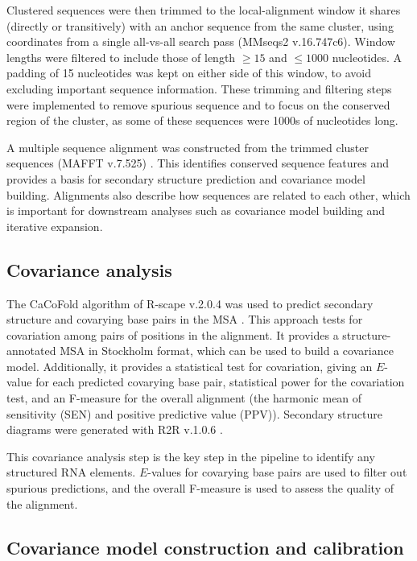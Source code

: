 Clustered sequences were then trimmed to the local-alignment window it shares (directly or transitively) with an anchor sequence from the same cluster, using coordinates from a single all-vs-all search pass (MMseqs2 v.16.747c6).
Window lengths were filtered to include those of length $\geq 15$ and $\leq 1000$ nucleotides.
A padding of 15 nucleotides was kept on either side of this window, to avoid excluding important sequence information.
These trimming and filtering steps were implemented to remove spurious sequence and to focus on the conserved region of the cluster, as some of these sequences were 1000s of nucleotides long.

\label{subsec:rna-alignment}

A multiple sequence alignment was constructed from the trimmed cluster sequences (MAFFT v.7.525) \citep{Katoh2013}.
This identifies conserved sequence features and provides a basis for secondary structure prediction and covariance model building.
Alignments also describe how sequences are related to each other, which is important for downstream analyses such as covariance model building and iterative expansion.

\subsection{Covariance analysis}
\label{subsec:covariance-analysis}

The CaCoFold algorithm of R-scape v.2.0.4 was used to predict secondary structure and covarying base pairs in the \ac{MSA} \citep{Rivas2017}.
This approach tests for covariation among pairs of positions in the alignment.
It provides a structure-annotated \ac{MSA} in Stockholm format, which can be used to build a covariance model.
Additionally, it provides a statistical test for covariation, giving an $E$-value for each predicted covarying base pair, statistical power for the covariation test, and an F-measure for the overall alignment (the harmonic mean of sensitivity (SEN) and positive predictive value (PPV)).
Secondary structure diagrams were generated with R2R v.1.0.6 \citep{Weinberg2011}.

This covariance analysis step is the key step in the pipeline to identify any structured RNA elements.
$E$-values for covarying base pairs are used to filter out spurious predictions, and the overall F-measure is used to assess the quality of the alignment.

\subsection{Covariance model construction and calibration}
\label{sec:build_cm}

